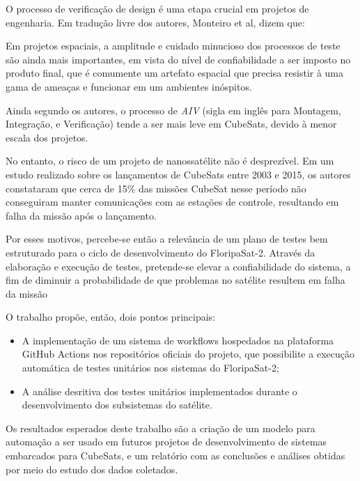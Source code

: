 O processo de verificação de design é uma etapa crucial em projetos de engenharia.
Em tradução livre dos autores, Monteiro et al, dizem que:

\begin{citacao}
\hspace{1,2cm}Em projetos espaciais, a amplitude e cuidado minucioso dos processos de teste são ainda mais importantes, em vista do nível de confiabilidade  a ser imposto no produto final, que é comumente um artefato espacial que precisa resistir à uma gama de ameaças e funcionar em um ambientes inóspitos. \cite{aiv-cubesat}
\end{citacao}

Ainda segundo os autores, o processo de \emph{AIV} (sigla em inglês para Montagem, Integração, e Verificação) tende a ser mais leve em CubeSats, devido à menor escala dos projetos.

No entanto, o risco de um projeto de nanossatélite não é desprezível. Em um estudo realizado sobre os lançamentos de CubeSats entre 2003 e 2015, os autores \cite{panga2016} constataram que cerca de 15\% das missões CubeSat nesse período não conseguiram manter comunicações com as estações de controle, resultando em falha da missão após o lançamento.

Por esses motivos, percebe-se então a relevância de um plano de testes bem estruturado para o ciclo de desenvolvimento do FloripaSat-2. Através da elaboração e execução de testes, pretende-se elevar a confiabilidade\cite{chen-2001} do sistema, a fim de diminuir a probabilidade de que problemas no satélite resultem em falha da missão


O trabalho propõe, então, dois pontos principais:

\begin{itemize}
    \item A implementação de um sistema de workflows hospedados na plataforma GitHub Actions \cite {gh-actions} nos repositórios oficiais do projeto, que possibilite a execução automática de testes unitários nos sistemas do FloripaSat-2;
    \item A análise desritiva dos testes unitários implementados durante o desenvolvimento dos subsistemas do satélite.
\end{itemize}

Os resultados esperados deste trabalho são a criação de um modelo para automação a ser usado em futuros projetos de desenvolvimento de sistemas embarcados para CubeSats, e um relatório com as conclusões e análises obtidas por meio do estudo dos dados coletados.

